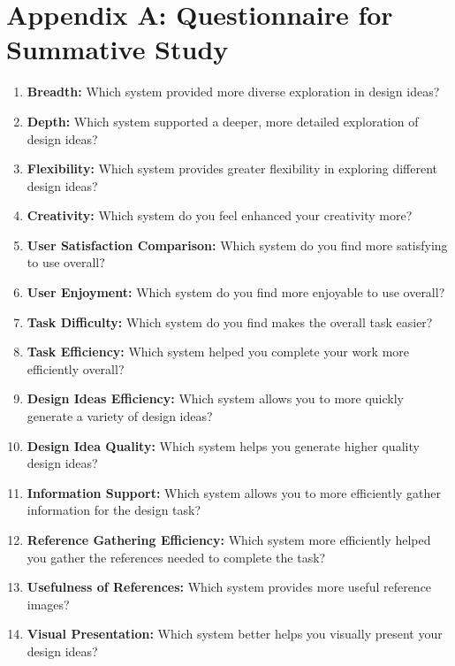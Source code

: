 

\appendix

\section{Appendix A: Questionnaire for Summative Study}
\label{AppendixA}
\begin{enumerate}[label=\textbf{\arabic*.}, leftmargin=0.5in, align=left]
    \item \textbf{Breadth:} Which system provided more diverse exploration in design ideas?
    \item \textbf{Depth:} Which system supported a deeper, more detailed exploration of design ideas? 
    \item \textbf{Flexibility:} Which system provides greater flexibility in exploring different design ideas? 
    \item \textbf{Creativity:} Which system do you feel enhanced your creativity more? 
    \item \textbf{User Satisfaction Comparison:} Which system do you find more satisfying to use overall? 
    \item \textbf{User Enjoyment:} Which system do you find more enjoyable to use overall? 
    \item \textbf{Task Difficulty:} Which system do you find makes the overall task easier? 
    \item \textbf{Task Efficiency:} Which system helped you complete your work more efficiently overall? 
    \item \textbf{Design Ideas Efficiency:} Which system allows you to more quickly generate a variety of design ideas? 
    \item \textbf{Design Idea Quality:} Which system helps you generate higher quality design ideas? 
    \item \textbf{Information Support:} Which system allows you to more efficiently gather information for the design task? 
    \item \textbf{Reference Gathering Efficiency:} Which system more efficiently helped you gather the references needed to complete the task? 
    \item \textbf{Usefulness of References:} Which system provides more useful reference images? 
    \item \textbf{Visual Presentation:} Which system better helps you visually present your design ideas? 
\end{enumerate}

